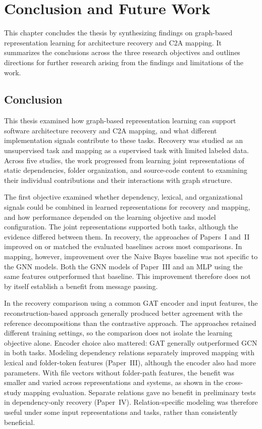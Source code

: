 \chapter{Conclusion and Future Work \label{ch:conclusion}}
\chaptertoc

This chapter concludes the thesis by synthesizing findings on graph-based representation learning for architecture recovery and C2A mapping. It summarizes the conclusions across the three research objectives and outlines directions for further research arising from the findings and limitations of the work.

\section{Conclusion \label{sec:conclusion}}

This thesis examined how graph-based representation learning can support software architecture recovery and C2A mapping, and what different implementation signals contribute to these tasks. Recovery was studied as an unsupervised task and mapping as a supervised task with limited labeled data. Across five studies, the work progressed from learning joint representations of static dependencies, folder organization, and source-code content to examining their individual contributions and their interactions with graph structure.

The first objective examined whether dependency, lexical, and organizational signals could be combined in learned representations for recovery and mapping, and how performance depended on the learning objective and model configuration. The joint representations supported both tasks, although the evidence differed between them. In recovery, the approaches of Papers~I and~II improved on or matched the evaluated baselines across most comparisons. In mapping, however, improvement over the Naive Bayes baseline was not specific to the GNN models. Both the GNN models of Paper~III and an MLP using the same features outperformed that baseline. This improvement therefore does not by itself establish a benefit from message passing.

In the recovery comparison using a common GAT encoder and input features, the reconstruction-based approach generally produced better agreement with the reference decompositions than the contrastive approach. The approaches retained different training settings, so the comparison does not isolate the learning objective alone. Encoder choice also mattered: GAT generally outperformed GCN in both tasks. Modeling dependency relations separately improved mapping with lexical and folder-token features (Paper~III), although the encoder also had more parameters. With file vectors without folder-path features, the benefit was smaller and varied across representations and systems, as shown in the cross-study mapping evaluation. Separate relations gave no benefit in preliminary tests in dependency-only recovery (Paper~IV). Relation-specific modeling was therefore useful under some input representations and tasks, rather than consistently beneficial.


